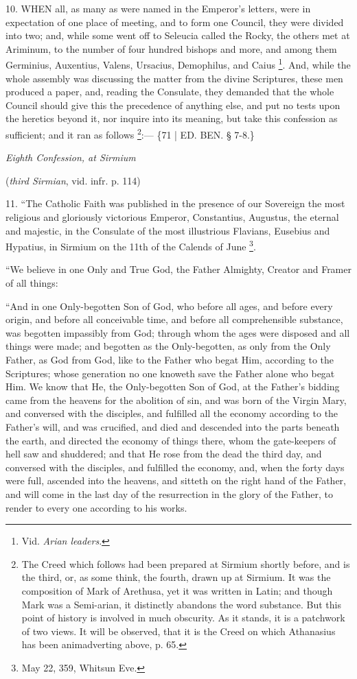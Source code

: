 
10. WHEN
all, as many as were named in the Emperor's letters, were in
expectation of one place of meeting, and to form one Council, they
were divided into two; and, while some went off to Seleucia called the
Rocky, the others met at Ariminum, to the number of four hundred
bishops and more, and among them Germinius, Auxentius, Valens,
Ursacius, Demophilus, and Caius \footnote{Vid. \emph{Arian leaders}.}. And, while the whole assembly was discussing the matter from
the divine Scriptures, these men produced a paper, and, reading the
Consulate, they demanded that the whole Council should give this the
precedence of anything else, and put no tests upon the heretics beyond
it, nor inquire into its meaning, but take this confession as
sufficient; and it ran as follows \footnote{The Creed which follows had been prepared at Sirmium shortly before,
and is the third, or, as some think, the fourth, drawn up at Sirmium.
It was the composition of Mark of Arethusa, yet it was written in
Latin; and though Mark was a Semi-arian, it distinctly abandons the
word substance. But this point of history is involved in much
obscurity. As it stands, it is a patchwork of two views. It will be
observed, that it is the Creed on which Athanasius has been
animadverting above, p. 65.}:— \{71 | ED.
BEN.
§ 7-8.\}

\emph{Eighth Confession, at
Sirmium}

(\emph{third Sirmian}, vid. infr.
p. 114)

11. ``The Catholic Faith was
published in the presence of our Sovereign the most religious and
gloriously victorious Emperor, Constantius, Augustus, the eternal and
majestic, in the Consulate of the most illustrious Flavians, Eusebius
and Hypatius, in Sirmium on the 11th of the Calends of June \footnote{May 22, 359, Whitsun Eve.}.

``We believe in one Only and
True God, the Father Almighty, Creator and Framer of all things:

``And in one Only-begotten Son
of God, who before all ages, and before every origin, and before all
conceivable time, and before all comprehensible substance, was
begotten impassibly from God; through whom the ages were disposed and
all things were made; and begotten as the Only-begotten, as only from
the Only Father, as God from God, like to the Father who begat Him,
according to the Scriptures; whose generation no one knoweth save the
Father alone who begat Him. We know that He, the Only-begotten Son of
God, at the Father's bidding came from the heavens for the abolition
of sin, and was born of the Virgin Mary, and conversed with the
disciples, and fulfilled all the economy according to the Father's
will, and was crucified, and died and descended into the parts beneath
the earth, and directed the economy of things there, whom the
gate-keepers of hell saw and shuddered; and that He rose from the dead
the third day, and conversed with the disciples, and fulfilled the
economy, and, when the forty days were full, ascended into the
heavens, and sitteth on the right hand of the Father, and will
come in the last day of the resurrection in the glory of the Father,
to render to every one according to his works.

